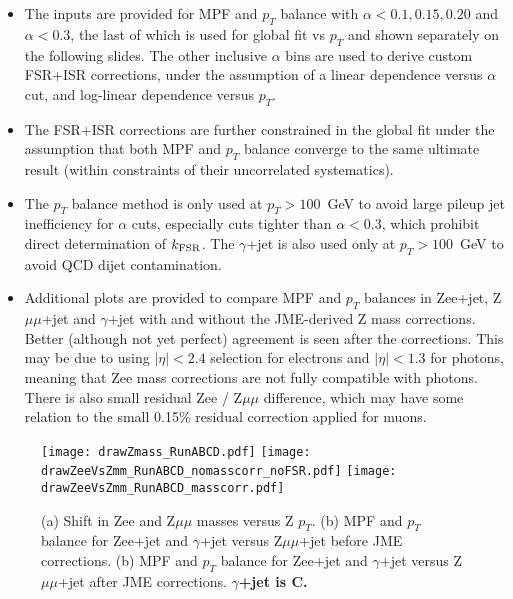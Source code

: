 \documentclass[landscape,10pt]{beamer} %
\begin{document}
\begin{itemize}

\item The inputs are provided for MPF and $p_T$ balance with $\alpha<0.1, 0.15, 0.20$ and $\alpha<0.3$, the last of which is used for global fit vs $p_T$ and shown separately on the following slides. The other inclusive $\alpha$ bins are used to derive custom FSR+ISR corrections, under the assumption of a linear dependence versus $\alpha$ cut, and log-linear dependence versus $p_T$.

\item The FSR+ISR corrections are further constrained in the global fit under the assumption that both MPF and $p_T$ balance converge to the same ultimate result (within constraints of their uncorrelated systematics).

\item The $p_T$ balance method is only used at $p_T>100$~GeV to avoid large pileup jet inefficiency for $\alpha$ cuts, especially cuts tighter than $\alpha<0.3$, which prohibit direct determination of $k_{\rm FSR}$. The $\gamma$+jet is also used only at $p_T>100$~GeV to avoid QCD dijet contamination.

\item Additional plots are provided to compare MPF and $p_T$ balances in Zee+jet, Z$\mu\mu$+jet and $\gamma$+jet with and without the JME-derived Z mass corrections. Better (although not yet perfect) agreement is seen after the corrections. This may be due to using $|\eta|<2.4$ selection for electrons and $|\eta|<1.3$ for photons, meaning that Zee mass corrections are not fully compatible with photons. There is also small residual Zee / Z$\mu\mu$ difference, which may have some relation to the small 0.15\% residual correction applied for muons.

\end{itemize}

\newpage
\begin{figure}[hp!]
\centering
  \texttt{[image: drawZmass\_RunABCD.pdf]}
  \texttt{[image: drawZeeVsZmm\_RunABCD\_nomasscorr\_noFSR.pdf]}
  \texttt{[image: drawZeeVsZmm\_RunABCD\_masscorr.pdf]}
\caption{
(a) Shift in Zee and Z$\mu\mu$ masses versus Z $p_T$.
(b) MPF and $p_T$ balance for Zee+jet and $\gamma$+jet versus Z$\mu\mu$+jet before JME corrections.
(b) MPF and $p_T$ balance for Zee+jet and $\gamma$+jet versus Z$\mu\mu$+jet after JME corrections.
{\bf $\gamma$+jet is C.}
}
\end{figure}
\end{document}
